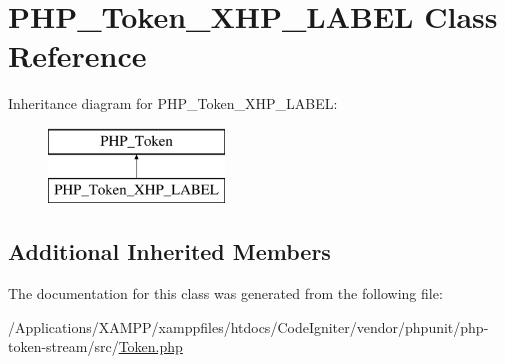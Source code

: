 \hypertarget{class_p_h_p___token___x_h_p___l_a_b_e_l}{}\section{P\+H\+P\+\_\+\+Token\+\_\+\+X\+H\+P\+\_\+\+L\+A\+B\+EL Class Reference}
\label{class_p_h_p___token___x_h_p___l_a_b_e_l}
Inheritance diagram for P\+H\+P\+\_\+\+Token\+\_\+\+X\+H\+P\+\_\+\+L\+A\+B\+EL\+:\begin{figure}[H]
\begin{center}
\leavevmode
\includegraphics[height=2.000000cm]{class_p_h_p___token___x_h_p___l_a_b_e_l}
\end{center}
\end{figure}
\subsection*{Additional Inherited Members}


The documentation for this class was generated from the following file\+:\begin{DoxyCompactItemize}
\item 
/\+Applications/\+X\+A\+M\+P\+P/xamppfiles/htdocs/\+Code\+Igniter/vendor/phpunit/php-\/token-\/stream/src/\mbox{\hyperlink{_token_8php}{Token.\+php}}\end{DoxyCompactItemize}
